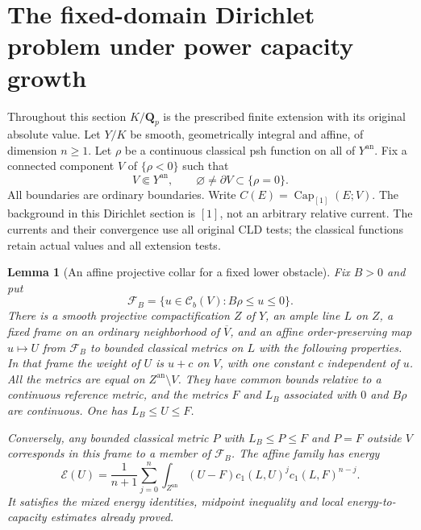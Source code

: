 \documentclass[11pt,a4paper]{article}
\numberwithin{equation}{section}
\newtheorem{lemma}[theorem]{Lemma}
\theoremstyle{definition}
\theoremstyle{remark}
\newcommand{\Cb}{\mathcal C_b}
\newcommand{\an}{\mathrm{an}}
\begin{document}


\section{The fixed-domain Dirichlet problem under power capacity growth}
\label{sec:r3-capacity-dirichlet}

Throughout this section $K/\mathbf Q_p$ is the prescribed finite
extension with its original absolute value. Let $Y/K$ be smooth,
geometrically integral and affine, of dimension $n\geq1$. Let
$\rho$ be a continuous classical psh function on all of $Y^{\an}$.
Fix a connected component $V$ of $\{\rho<0\}$ such that
\[
 V\Subset Y^{\an},\qquad
 \varnothing\ne\partial V\subset\{\rho=0\}.
\]
All boundaries are ordinary boundaries. Write
$C(E)=\operatorname{Cap}_{[1]}(E;V)$. The background in this
Dirichlet section is $[1]$, not an arbitrary relative current.
The currents and their convergence use all original CLD tests;
the classical functions retain actual values and all extension tests.

\begin{lemma}[An affine projective collar for a fixed lower obstacle]
\label{lem:r3-capdir-affine-collar}
Fix $B>0$ and put
\[
 \mathcal F_B=\{u\in\Cb(V):B\rho\leq u\leq0\}.
\]
There is a smooth projective compactification $Z$ of $Y$, an ample
line $L$ on $Z$, a fixed frame on an ordinary neighborhood of
$\overline V$, and an affine order-preserving map
$u\mapsto U$ from $\mathcal F_B$ to bounded classical metrics
on $L$ with the following properties. In that frame the weight
of $U$ is $u+c$ on $V$, with one constant $c$ independent of $u$.
All the metrics are equal on $Z^{\an}\setminus V$. They have
common bounds relative to a continuous reference metric, and the
metrics $F$ and $L_B$ associated with $0$ and $B\rho$ are
continuous. One has $L_B\leq U\leq F$.

Conversely, any bounded classical metric $P$ with
$L_B\leq P\leq F$ and $P=F$ outside $V$ corresponds in this
frame to a member of $\mathcal F_B$. The affine family has energy
\[
 \mathcal E(U)=\frac1{n+1}\sum_{j=0}^n
  \int_{Z^{\an}}(U-F)c_1(L,U)^j c_1(L,F)^{n-j}.
\]
It satisfies the mixed energy identities, midpoint inequality and
local energy-to-capacity estimates already proved.
\end{lemma}
\end{document}
